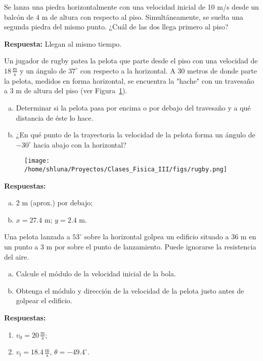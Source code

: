 \documentclass[addpoints]{exam}
\newcommand{\grado}[0]{^{\circ}}
\newcommand{\rta}{\textbf{Respuesta: }}
\newcommand{\rtas}{\textbf{Respuestas: }}
\begin{document}
\begin{questions}
    \question Se lanza una piedra horizontalmente con una velocidad inicial de 10 m/s desde un balcón de $4$ m de altura con respecto al piso. Simultáneamente, se suelta una segunda piedra del mismo punto. ¿Cuál de las dos llega primero al piso? 
    
    \rta Llegan al mismo tiempo.

    \question Un jugador de rugby patea la pelota que parte desde el piso con una velocidad de $18 \, \frac{\text{m}}{\text{s}}$ y un ángulo de $37\grado$ con respecto a la horizontal. A 30 metros de donde parte la pelota, medidos en forma horizontal, se encuentra la "hache" con un travesaño a 3 m de altura del piso (ver Figura~\ref{fig:rugby}). 
    \begin{enumerate}[a)]
        \item Determinar si la pelota pasa por encima o por debajo del travesaño y a qué distancia de éste lo hace.
        \item ¿En qué punto de la trayectoria la velocidad de la pelota forma un ángulo de $-30\grado$ hacia abajo con la horizontal?
    \end{enumerate}

    \begin{figure}[ht]
        \centering
        \texttt{[image: /home/shluna/Proyectos/Clases\_Fisica\_III/figs/rugby.png]}
        \caption{ }
        \label{fig:rugby}
    \end{figure}

    \rtas 
    \begin{enumerate}[a)]
        \item 2 m (aprox.) por debajo;
        \item $x=27.4$ m; $y = 2.4$ m.
    \end{enumerate}

    \question Una pelota lanzada a $53\grado$ sobre la horizontal golpea un edificio situado a 36 m en un punto a 3 m por sobre el punto de lanzamiento. Puede ignorarse la resistencia del aire. 
    \begin{enumerate}[a)]
        \item Calcule el módulo de la velocidad inicial de la bola.
        \item Obtenga el módulo y dirección de la velocidad de la pelota justo antes de golpear el edificio.
    \end{enumerate}

    \rtas
    \begin{enumerate}
        \item $v_0 = 20 \, \frac{\text{m}}{\text{s}}$;
        \item $v_\text{f} = 18.4 \, \frac{\text{m}}{\text{s}}$, $\theta = - 49.4\grado$.
    \end{enumerate}


\end{questions}
\end{document}
